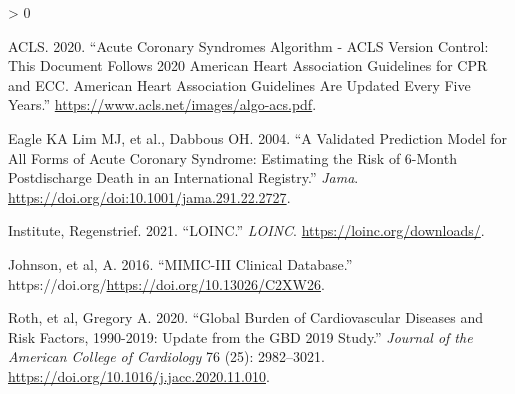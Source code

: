 \documentclass[
]{article}
\newlength{\cslhangindent}
\newenvironment{CSLReferences}[2] %
 {%
  \setlength{\parindent}{0pt}
  \ifodd #1 \everypar{\setlength{\hangindent}{\cslhangindent}}\ignorespaces\fi
  \ifnum #2 > 0
  \setlength{\parskip}{#2\baselineskip}
  \fi
 }%
 {}
\begin{document}
\hypertarget{refs}{}
\begin{CSLReferences}{1}{0}
\leavevmode\hypertarget{ref-americanheart}{}%
ACLS. 2020. {``Acute Coronary Syndromes Algorithm - ACLS Version
Control: This Document Follows 2020 American Heart Association
Guidelines for CPR and ECC. American Heart Association Guidelines Are
Updated Every Five Years.''}
\url{https://www.acls.net/images/algo-acs.pdf}.

\leavevmode\hypertarget{ref-Eagle}{}%
Eagle KA Lim MJ, et al., Dabbous OH. 2004. {``A Validated Prediction
Model for All Forms of Acute Coronary Syndrome: Estimating the Risk of
6-Month Postdischarge Death in an International Registry.''}
\emph{Jama}. \url{https://doi.org/doi:10.1001/jama.291.22.2727}.

\leavevmode\hypertarget{ref-loinc}{}%
Institute, Regenstrief. 2021. {``LOINC.''} \emph{LOINC}.
\url{https://loinc.org/downloads/}.

\leavevmode\hypertarget{ref-johnson}{}%
Johnson, et al, A. 2016. {``{MIMIC}-{III} {Clinical} {Database}.''}
https://doi.org/\url{https://doi.org/10.13026/C2XW26}.

\leavevmode\hypertarget{ref-roth}{}%
Roth, et al, Gregory A. 2020. {``Global Burden of Cardiovascular
Diseases and Risk Factors, 1990-2019: Update from the GBD 2019 Study.''}
\emph{Journal of the American College of Cardiology} 76 (25):
2982--3021. \url{https://doi.org/10.1016/j.jacc.2020.11.010}.

\end{CSLReferences}
\end{document}
